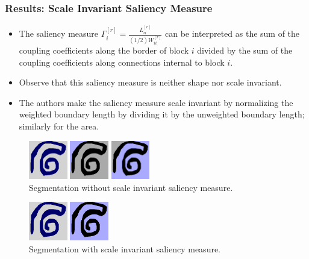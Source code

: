\documentclass[8pt]{beamer}
\begin{document}
\begin{frame}
\frametitle{Results: Scale Invariant Saliency Measure}

\begin{itemize}
\item The saliency measure $\displaystyle{\Gamma_i^{[r]} = \frac{L_{ii}^{[r]}}{(1/2)W_{ii}^{[r]}}}$ can be interpreted as the sum of the coupling coefficients along the border of block $i$ divided by the sum of the coupling coefficients along connections internal to block $i$. 
\item Observe that this saliency measure is neither shape nor scale invariant.
\item The authors make the saliency measure scale invariant by normalizing the weighted boundary length by dividing it by the unweighted boundary length; similarly for the area.
\end{itemize}

\begin{figure}[ht]
\centering
\includegraphics[width=0.15\textwidth,height=0.15\textwidth]{spiral_bad_seg_1.png} \hspace{.45cm}
\includegraphics[width=0.15\textwidth,height=0.15\textwidth]{spiral_bad_seg_2.png} \hspace{.45cm}
\includegraphics[width=0.15\textwidth,height=0.15\textwidth]{spiral_bad_seg_3.png}
~\\Segmentation without scale invariant saliency measure.
\end{figure}

\begin{figure}[ht]
\centering
\includegraphics[width=0.15\textwidth,height=0.15\textwidth]{spiral_good_seg_1.png} \hspace{.45cm}
\includegraphics[width=0.15\textwidth,height=0.15\textwidth]{spiral_good_seg_2.png}
~\\Segmentation with scale invariant saliency measure.
\end{figure}


\end{frame}
\end{document}
